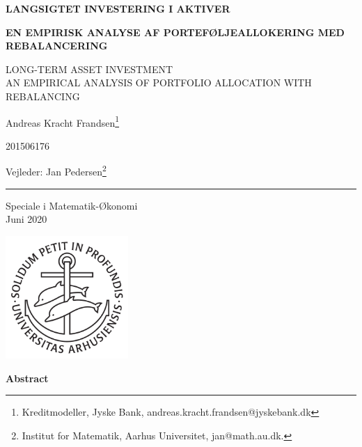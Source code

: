 \begin{titlingpage}
\begin{center}
\LARGE \textbf{LANGSIGTET INVESTERING I AKTIVER}

\vspace{2mm}

\renewcommand{\thefootnote}{\fnsymbol{footnote}}
\large \textbf{EN EMPIRISK ANALYSE AF PORTEFØLJEALLOKERING MED REBALANCERING}

\tiny LONG-TERM ASSET INVESTMENT\\ AN EMPIRICAL ANALYSIS OF PORTFOLIO ALLOCATION WITH REBALANCING

\vspace{2mm}

\Large Andreas Kracht Frandsen\footnote{Kreditmodeller, Jyske Bank, andreas.kracht.frandsen@jyskebank.dk}

\Large 201506176

\Large Vejleder: Jan Pedersen\footnote{Institut for Matematik, Aarhus Universitet, jan@math.au.dk.}

\vspace{2mm}

\rule{1cm}{0.4pt}

\vspace{2mm}

Speciale i Matematik-Økonomi\\
Juni 2020

\vfill

\includegraphics[width=0.35\textwidth]{latex/ausegl_sort.pdf}

\vfill

\end{center}
\begin{center}
\textbf{Abstract}


\end{center}
\end{titlingpage}
